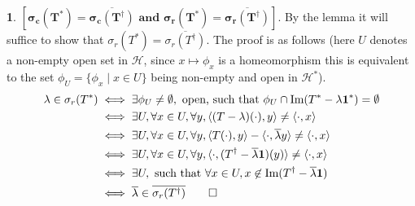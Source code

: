 \documentclass[11pt]{article}
\theoremstyle{definition}
\newtheorem{pb}{}
\newcommand{\set}[1]{\{#1\}}
\newcommand{\tand}{\text{ and }}
\newcommand{\im}{\text{Im}}
\newcommand{\gen}[1]{\langle #1 \rangle}
\begin{document}
\begin{pb}
        \(\mathbf{[\sigma_c(T^*) = \overline{\sigma_c(T^\dagger)} \tand \sigma_r(T^*) = \overline{\sigma_r(T^\dagger)}].}\) By the lemma it will suffice to show that \(\sigma_r(T^*) = \overline{\sigma_r(T^\dagger)}\). The proof is as follows (here \(U\) denotes a non-empty open set in \(\mathcal{H}\), since \(x \mapsto \phi_x\) is a homeomorphism this is equivalent to the set \(\phi_U = \set{\phi_x \mid x \in U} \) being non-empty and open in \(\mathcal{H}^*\)).
        \begin{align*}
            \lambda \in \sigma_r(T^*) &\iff \exists \phi_U \neq \emptyset, \text{ open, such that } \phi_U \cap \im(T^* - \lambda \mathbf{1}^*) = \emptyset \\
            &\iff \exists U, \forall x \in U, \forall y, \gen{(T - \lambda)(\cdot),y} \neq \gen{\cdot,x} \\
            &\iff \exists U, \forall x \in U, \forall y, \gen{T(\cdot),y} - \gen{\cdot,\overline{\lambda}y}  \neq \gen{\cdot,x} \\
            &\iff \exists U, \forall x \in U, \forall y, \gen{\cdot,(T^\dagger - \overline{\lambda}\mathbf{1})(y)} \neq \gen{\cdot,x} \\
            &\iff \exists U, \text{ such that } \forall x \in U, x \not \in \im(T^\dagger - \overline{\lambda}\mathbf{1}) \\
            &\iff \overline{\lambda} \in \overline{\sigma_r(T^\dagger)} \qed
        \end{align*}
    \end{pb}
\end{document}
